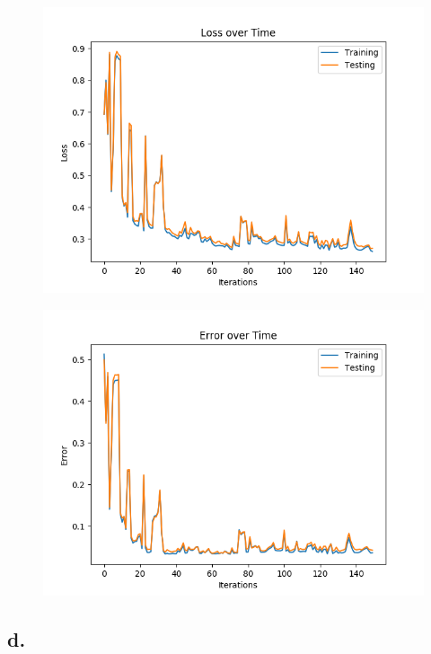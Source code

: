 \documentclass{article}
\newcommand{\1}{\mathbf{1}}
\begin{document}
{\begin{figure}[h]
  \centering
  \includegraphics[width=120mm]{../hw2-code/results/a6_ci.png}
\end{figure}

\begin{figure}[h]
  \centering
  \includegraphics[width=120mm]{../hw2-code/results/a6_cii.png}
\end{figure}

\newpage

\subsection*{d.}

}
\end{document}
